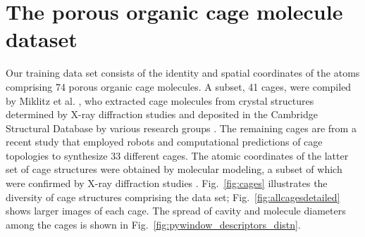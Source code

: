 \documentclass[journal=jacsat,manuscript=article,layout=traditional]{achemso}
\begin{document}
\section{The porous organic cage molecule dataset} Our training data set consists of the identity and spatial coordinates of the atoms comprising 74 porous organic cage molecules. A subset, 41 cages, were compiled by Miklitz et al. \cite{miklitz2017computational}, {\color{red} who extracted cage molecules from crystal structures determined by X-ray diffraction studies and deposited in the Cambridge Structural Database \cite{allen2002cambridge} by various research groups \cite{hasell2016porous,evans2015synthesis,zhang2014organic}}. The remaining cages are from a recent study that employed robots and {\color{red} computational predictions of cage topologies} \cite{greenaway2018high} to synthesize 33 different cages. {\color{red} The atomic coordinates of the latter set of cage structures were obtained by molecular modeling, a subset of which were confirmed by X-ray diffraction studies \cite{greenaway2018high}.} Fig.~\ref{fig:cages} illustrates the diversity of cage structures comprising the data set; Fig.~\ref{fig:allcagesdetailed} shows larger images of each cage. The spread of cavity and molecule diameters among the cages is shown in Fig.~\ref{fig:pywindow_descriptors_distn}.
\end{document}
